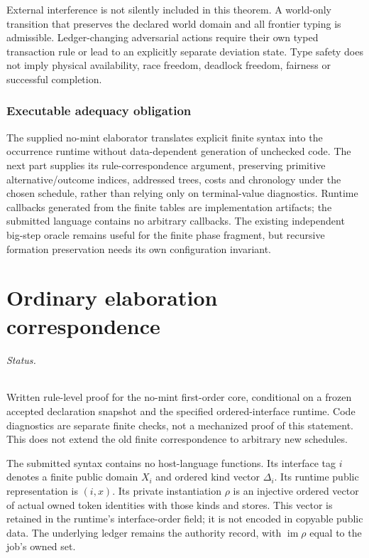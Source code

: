 \documentclass[11pt]{article}
\begin{document}
External interference is not silently included in this theorem. A world-only transition that preserves the declared world domain and all frontier typing is admissible. Ledger-changing adversarial actions require their own typed transaction rule or lead to an explicitly separate deviation state. Type safety does not imply physical availability, race freedom, deadlock freedom, fairness or successful completion.

\section{Executable adequacy obligation}
The supplied no-mint elaborator translates explicit finite syntax into the occurrence runtime without data-dependent generation of unchecked code. The next part supplies its rule-correspondence argument, preserving primitive alternative/outcome indices, addressed trees, costs and chronology under the chosen schedule, rather than relying only on terminal-value diagnostics. Runtime callbacks generated from the finite tables are implementation artifacts; the submitted language contains no arbitrary callbacks. The existing independent big-step oracle remains useful for the finite phase fragment, but recursive formation preservation needs its own configuration invariant.

\part{Ordinary elaboration correspondence}

\paragraph{Status.} Written rule-level proof for the no-mint first-order core, conditional on a frozen accepted declaration snapshot and the specified ordered-interface runtime. Code diagnostics are separate finite checks, not a mechanized proof of this statement. This does not extend the old finite correspondence to arbitrary new schedules.

The submitted syntax contains no host-language functions. Its interface tag $i$ denotes a finite public domain $X_i$ and ordered kind vector $\Delta_i$. Its runtime public representation is $(i,x)$. Its private instantiation $\rho$ is an injective ordered vector of actual owned token identities with those kinds and stores. This vector is retained in the runtime's interface-order field; it is not encoded in copyable public data. The underlying ledger remains the authority record, with $\operatorname{im}\rho$ equal to the job's owned set.
\end{document}

